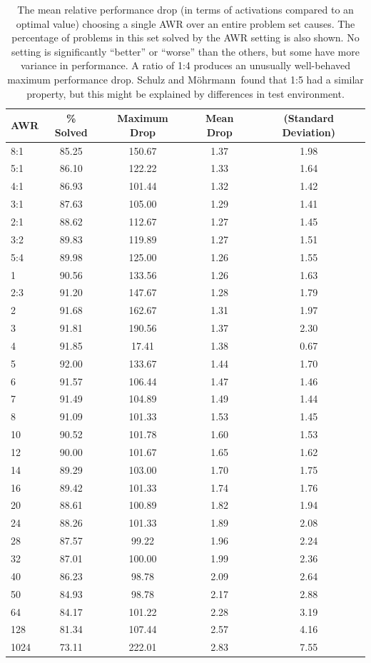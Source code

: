 \documentclass{llncs}
\newcommand{\sandm}{Schulz and M{\"{o}}hrmann}
\begin{document}
\begin{table}[t]
	\caption{
The mean relative performance drop (in terms of activations compared to an optimal value) choosing a single AWR over an entire problem set causes.
The percentage of problems in this set solved by the AWR setting is also shown.
No setting is significantly ``better'' or ``worse'' than the others, but some have more variance in performance.
A ratio of 1:4 produces an unusually well-behaved maximum performance drop.
\sandm~found that 1:5 had a similar property, but this might be explained by differences in test environment.
}
	\centering
	\begin{tabular}{l | c | c | c  c }
		AWR & \% Solved & Maximum Drop & Mean Drop & (Standard Deviation)\\
\hline
8:1 & 85.25 & 150.67 & 1.37 & 1.98\\
5:1 & 86.10 & 122.22 & 1.33 & 1.64\\
4:1 & 86.93 & 101.44 & 1.32 & 1.42\\
3:1 & 87.63 & 105.00 & 1.29 & 1.41\\
2:1 & 88.62 & 112.67 & 1.27 & 1.45\\
3:2 & 89.83 & 119.89 & 1.27 & 1.51\\
5:4 & 89.98 & 125.00 & 1.26 & 1.55\\
1   & 90.56 & 133.56 & 1.26 & 1.63\\
2:3 & 91.20 & 147.67 & 1.28 & 1.79\\
2   & 91.68 & 162.67 & 1.31 & 1.97\\
3   & 91.81 & 190.56 & 1.37 & 2.30\\
4   & 91.85 & 17.41 & 1.38 & 0.67\\
5   & 92.00 & 133.67 & 1.44 & 1.70\\
6   & 91.57 & 106.44 & 1.47 & 1.46\\
7   & 91.49 & 104.89 & 1.49 & 1.44\\
8   & 91.09 & 101.33 & 1.53 & 1.45\\
10  & 90.52 & 101.78 & 1.60 & 1.53\\
12  & 90.00 & 101.67 & 1.65 & 1.62\\
14  & 89.29 & 103.00 & 1.70 & 1.75\\
16  & 89.42 & 101.33 & 1.74 & 1.76\\
20  & 88.61 & 100.89 & 1.82 & 1.94\\
24  & 88.26 & 101.33 & 1.89 & 2.08\\
28  & 87.57 & 99.22 & 1.96 & 2.24\\
32  & 87.01 & 100.00 & 1.99 & 2.36\\
40  & 86.23 & 98.78 & 2.09 & 2.64\\
50  & 84.93 & 98.78 & 2.17 & 2.88\\
64  & 84.17 & 101.22 & 2.28 & 3.19\\
128 & 81.34 & 107.44 & 2.57 & 4.16\\
1024 & 73.11 & 222.01 & 2.83 & 7.55
	\end{tabular}

	\label{tab:no-best-awr}
\end{table}
\end{document}
